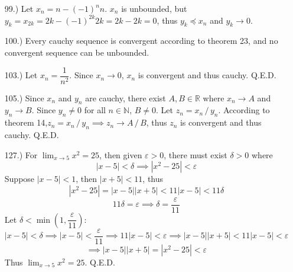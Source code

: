 \documentclass[12pt]{article}
\newcommand{\vertb}[1]{\left\vert#1\right\vert}
\newcommand{\parns}[1]{\left(#1\right)}
\newcommand{\e}{\varepsilon}
\newcommand{\di}{\,/\,}
\newcommand{\lm}[1]{\displaystyle\lim_{#1}}
\begin{document}
\begin{itemize}

    \item [99.)] Let $x_n=n-(-1)^nn$. $x_n$ is unbounded, but $y_k=x_{2k}=2k-(-1)^{2k}2k=2k-2k=0$, thus $y_k\preceq x_n$ and $y_k\to0$.

    \item [100.)] Every cauchy sequence is convergent according to theorem 23, and no convergent sequence can be unbounded.

    \item [103.)] Let $x_n=\dfrac{1}{n^2}$. Since $x_n\to0$, $x_n$ is convergent and thus cauchy. Q.E.D.

    \item [105.)] Since $x_n$ and $y_n$ are cauchy, there exist $A,B\in\mathbb{R}$ where $x_n\to A$ and $y_n\to B$. Since $y_n\ne0$ for all $n\in\mathbb{N}$, $B\ne0$. Let $z_n=x_n\di y_n$. According to theorem 14,\break $z_n=x_n\di y_n\implies z_n\to A\di B$, thus $z_n$ is convergent and thus cauchy. Q.E.D.














    \item [127.)] For $\lm{x\to5}x^2=25$, then given $\e>0$, there must exist $\delta>0$ where
    \[\vertb{x-5}<\delta\implies\vertb{x^2-25}<\e\]
    Suppose $\vertb{x-5}<1$, then $\vertb{x+5}<11$, thus 
    \[\vertb{x^2-25}=\vertb{x-5}\vertb{x+5}<11\vertb{x-5}<11\delta\]
    \[11\delta=\e\implies\delta=\frac{\e}{11}\]
    Let $\delta<\min\parns{1,\dfrac{\e}{11}}$:
    \[\vertb{x-5}<\delta\implies\vertb{x-5}<\dfrac{\e}{11}\implies11\vertb{x-5}<\e\implies\vertb{x-5}\vertb{x+5}<11\vertb{x-5}<\e\]
    \[\implies\vertb{x-5}\vertb{x+5}=\vertb{x^2-25}<\e\]
    Thus $\lm{x\to5}x^2=25$. Q.E.D.


\end{itemize}
\end{document}
